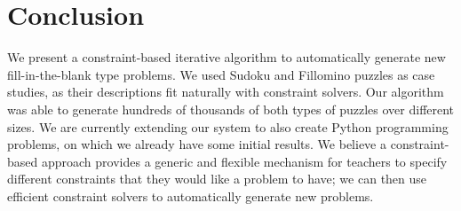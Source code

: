 \section{Conclusion}

We present a constraint-based iterative algorithm to automatically generate new fill-in-the-blank type problems. We used Sudoku and Fillomino puzzles as case studies, as their descriptions fit naturally with constraint solvers. Our algorithm was able to generate hundreds of thousands of both types of puzzles over different sizes. We are currently extending our system to also create Python programming problems, on which we already have some initial results. We believe a constraint-based approach provides a generic and flexible mechanism for teachers to specify different constraints that they would like a problem to have; we can then use efficient constraint solvers to automatically generate new problems.